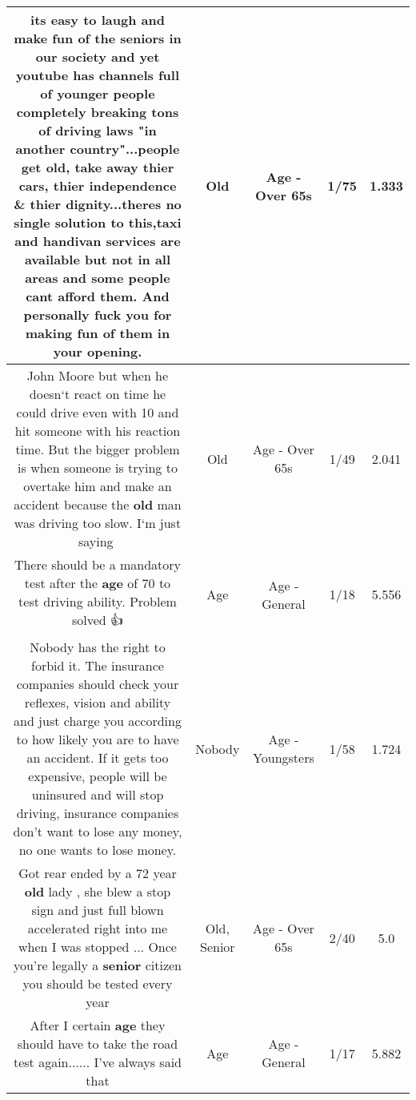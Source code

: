 \documentclass[11pt]{article}
\newlength\mylength
\begin{document}
\begin{center}
\begin{longtable}{|C{.65\mylength}|C{.30\mylength}|C{.12\mylength}|C{.12\mylength}|C{.12\mylength}|}
  \small its easy to laugh and make fun of the seniors in our society and yet youtube has channels full of younger people completely breaking tons of driving laws "in another country"...people get \textbf{old}, take away thier cars, thier independence \& thier dignity...theres no single solution to this,taxi and handivan services are available but not in all areas and some people cant afford them. And personally fuck you for making fun of them in your opening.\normalsize   & Old & Age - Over 65s & 1/75 & 1.333 \\  \hline
  \small John Moore but when he doesn‘t react on time he could drive even with 10 and hit someone with his reaction time. But the bigger problem is when someone is trying to overtake him and make an accident because the \textbf{old} man was driving too slow. I‘m just saying🤔\normalsize   & Old & Age - Over 65s & 1/49 & 2.041 \\  \hline
  \small There should be a mandatory test after the \textbf{age} of 70 to test driving ability. Problem solved 👍\normalsize   & Age & Age - General & 1/18 & 5.556 \\  \hline
  \small Nobody has the right to forbid it. The insurance companies should check your reflexes, vision and ability and just charge you according to how likely you are to have an accident. If it gets too expensive, people will be uninsured and will stop driving, insurance companies don't want to lose any money, no one wants to lose money.\normalsize   & Nobody & Age - Youngsters & 1/58 & 1.724 \\  \hline
  \small Got rear ended by a 72 year \textbf{old} lady , she blew a stop sign and just full blown accelerated right into me when I was stopped ... Once you're legally a \textbf{senior} citizen you should be tested every year\normalsize   & Old, Senior & Age - Over 65s & 2/40 & 5.0 \\  \hline
  \small After I certain \textbf{age} they should have to take the road test again...... I've always said that\normalsize   & Age & Age - General & 1/17 & 5.882 \\  \hline

\end{longtable}
\end{center}
\end{document}
